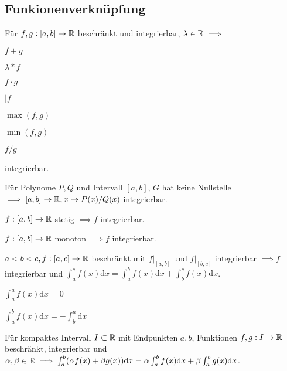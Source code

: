 \subsection{Funkionenverknüpfung}
\begin{compactitem}
    \item Für $f,g: [a, b] \to \mathbb{R}$ beschränkt und integrierbar, $\lambda \in \mathbb{R} \implies$
        \begin{inparaitem}
            \item $f+g$
            \item $\lambda * f$
            \item $f \cdot g$
            \item $|f|$
            \item $\max(f, g)$
            \item $\min(f, g)$
            \item $f / g$
        \end{inparaitem} integrierbar.
    \item Für Polynome $P, Q$ und Intervall $[a, b]$, $G$ hat keine Nullstelle $\implies [a, b] \to \mathbb{R}, x \mapsto P(x) / Q(x)$ integrierbar.
    \item $f: [a, b] \to \mathbb{R}$ stetig $\implies f$ integrierbar.
    \item $f: [a, b] \to \mathbb{R}$ monoton $\implies f$ integrierbar.
    \item $a < b < c, f: [a, c] \to \mathbb{R}$ beschränkt mit $f|_{[a,b]}$ und $f|_{[b,c]}$ integrierbar $\implies f$ integrierbar und $\int_{a}^{c} f(x) \mathrm{d}x = \int_{a}^{b} f(x) \mathrm{d}x + \int_{b}^{c} f(x) \mathrm{d}x$.
    \item
        \begin{inparaitem}
            \item $\int_{a}^{a} f(x)\mathrm{d}x = 0$
            \item $\int_{a}^{b} f(x)\mathrm{d}x = -\int_{b}^{a} \mathrm{d}x$
        \end{inparaitem}
    \item Für kompaktes Intervall $I \subset \mathbb{R}$ mit Endpunkten $a,b$, Funktionen $f, g : I \to \mathbb{R}$ beschränkt, integrierbar und $\alpha, \beta \in \mathbb{R} \implies \int_{a}^{b} (\alpha f(x) + \beta g(x)) \mathrm{d}x = \alpha \int_{a}^{b} f(x) \mathrm{d}x + \beta \int_{a}^{b} g(x)\mathrm{d}x$.
\end{compactitem}

